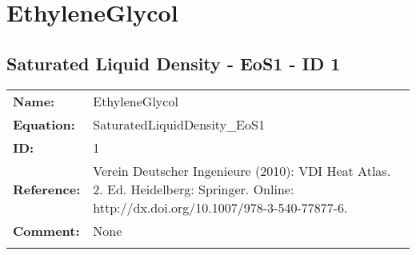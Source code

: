 \section{EthyleneGlycol}
%
\subsection{Saturated Liquid Density - EoS1 - ID 1}
%
\begin{tabular}[l]{|lp{11.5cm}|}
\hline
\addlinespace

\textbf{Name:} & EthyleneGlycol \\
\textbf{Equation:} & SaturatedLiquidDensity\_EoS1 \\
\textbf{ID:} & 1 \\
\textbf{Reference:} & Verein Deutscher Ingenieure (2010): VDI Heat Atlas. 2. Ed. Heidelberg: Springer. Online: http://dx.doi.org/10.1007/978-3-540-77877-6. \\
\textbf{Comment:} & None \\

\addlinespace
\hline
\end{tabular}
\newline

